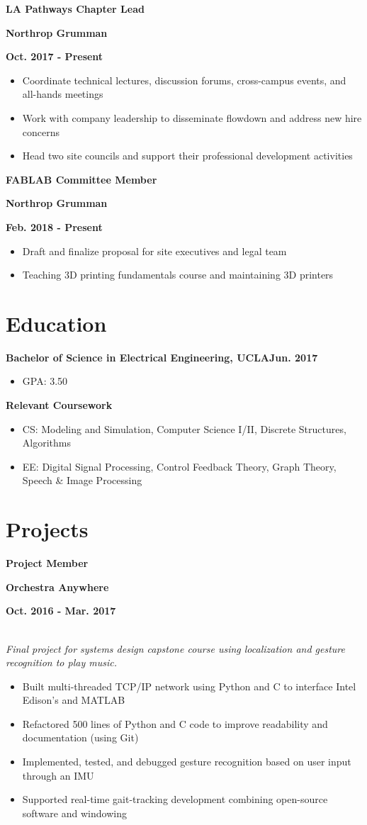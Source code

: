 \documentclass[12pt]{article}
\newcommand\textbox[1]{\parbox{.333\textwidth}{#1}}
\newcommand{\textlcr}[3]{\textbox{\textbf{#1}\hfill}\textbox{\hfil \textbf{#2}\hfil}\textbox{\hfill \textbf{#3}}}
\begin{document}
\textlcr{LA Pathways Chapter Lead}{Northrop Grumman}{Oct. 2017 - Present}
\begin{itemize}
\item Coordinate technical lectures, discussion forums, cross-campus events, and all-hands meetings
\item Work with company leadership to disseminate flowdown and address new hire concerns
\item Head two site councils and support their professional development activities
\end{itemize}

\bigskip
\textlcr{FABLAB Committee Member}{Northrop Grumman}{Feb. 2018 - Present}
\begin{itemize}
\item Draft and finalize proposal for site executives and legal team
\item Teaching 3D printing fundamentals course and maintaining 3D printers
\end{itemize}

\section*{Education}
\vspace*{-1em}\makebox[\linewidth]{\rule{\textwidth}{0.4pt}}

\textbf{Bachelor of Science in Electrical Engineering, UCLA}\hfill\textbf{Jun. 2017}
\begin{itemize}
\item GPA: 3.50
\end{itemize}

\textbf{Relevant Coursework}
\begin{itemize}
\item CS: Modeling and Simulation, Computer Science I/II, Discrete Structures, Algorithms
\item EE: Digital Signal Processing, Control Feedback Theory, Graph Theory, Speech \& Image Processing
\end{itemize}

\section*{Projects}
\vspace*{-1em}\makebox[\linewidth]{\rule{\textwidth}{0.4pt}}

\textlcr{Project Member}{Orchestra Anywhere}{Oct. 2016 - Mar. 2017}
\\ \textit{Final project for systems design capstone course using localization and gesture recognition to play music.}
\begin{itemize}
\item Built multi-threaded TCP/IP network using Python and C to interface Intel Edison's and MATLAB
\item Refactored 500 lines of Python and C code to improve readability and documentation (using Git)
\item Implemented, tested, and debugged gesture recognition based on user input through an IMU
\item Supported real-time gait-tracking development combining open-source software and windowing
\end{itemize}
\end{document}

